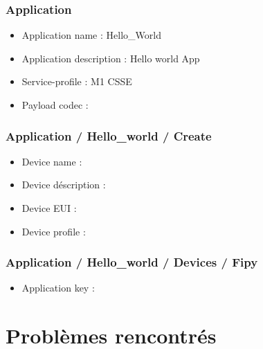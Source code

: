 \documentclass[letterpaper,10pt,french]{sphinxmanual}
\begin{document}
\subsubsection{Application}
\label{\detokenize{AnnexeA:application}}\begin{itemize}
\item {} 
Application name : Hello\_World

\item {} 
Application description : Hello world App

\item {} 
Service-profile : M1 CSSE

\item {} 
Payload codec : 

\end{itemize}


\subsubsection{Application / Hello\_world / Create}
\label{\detokenize{AnnexeA:application-hello-world-create}}\begin{itemize}
\item {} 
Device name : 

\item {} 
Device déscription : 

\item {} 
Device EUI : 

\item {} 
Device profile : 

\end{itemize}


\subsubsection{Application / Hello\_world / Devices / Fipy}
\label{\detokenize{AnnexeA:application-hello-world-devices-fipy}}\begin{itemize}
\item {} 
Application key : 

\end{itemize}


\section{Problèmes rencontrés}
\label{\detokenize{AnnexeA:problemes-rencontres}}
\end{document}
